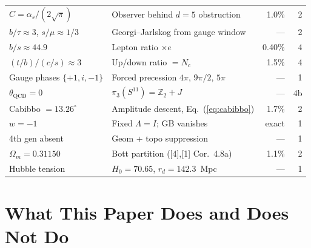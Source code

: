 \documentclass[12pt,a4paper]{article}
\begin{document}
\begin{center}
\begin{tabular}{llrr}
$C = \alpha_s/(2\sqrt{\pi})$ & Observer behind $d = 5$ obstruction & 1.0\% & 2 \\
$b/\tau \approx 3$, $s/\mu \approx 1/3$ & Georgi--Jarlskog from gauge window & --- & 2 \\
$b/s \approx 44.9$ & Lepton ratio $\times e$ & 0.40\% & 4 \\
$(t/b)/(c/s) \approx 3$ & Up/down ratio $= N_c$ & 1.5\% & 4 \\
Gauge phases $\{+1, i, -1\}$ & Forced precession $4\pi$, $9\pi/2$, $5\pi$ & --- & 1 \\
$\theta_{\text{QCD}} = 0$ & $\pi_3(S^{11}) = \mathbb{Z}_2 + J$ & --- & 4b \\
Cabibbo $= 13.26^\circ$ & Amplitude descent, Eq.~(\ref{eq:cabibbo}) & 1.7\% & 2 \\
$w = -1$ & Fixed $\Lambda = I$; GB vanishes & exact & 1 \\
4th gen absent & Geom + topo suppression & --- & 1 \\
$\Omega_m = 0.31150$ & Bott partition ([4],[1] Cor.\ 4.8a) & 1.1\% & 2 \\
Hubble tension & $H_0 = 70.65$, $r_d = 142.3$~Mpc & --- & 1 \\
\hline
\end{tabular}
\end{center}

\section{What This Paper Does and Does Not Do}
\end{document}
